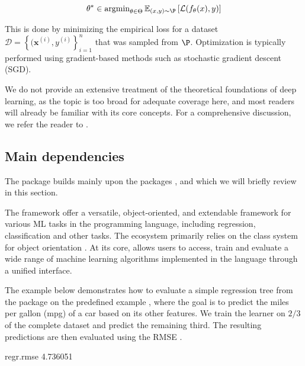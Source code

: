 \documentclass[article]{jss}
\theoremstyle{definition}
\begin{document}
\begin{equation}
\theta^* \in \operatorname{argmin}_{\theta \in \Theta} \mathbb{E}_{(x, y) \sim \P} \left[ \mathcal{L}(f_{\theta}(x), y) \right]
\end{equation}

This is done by minimizing the empirical loss for a dataset $\mathcal{D} = \left\{ (\mathbf{x}^{(i)}, y^{(i)} \right\}_{i=1}^n$ that was sampled from $\P$.
Optimization is typically performed using gradient-based methods such as stochastic gradient descent (SGD).

We do not provide an extensive treatment of the theoretical foundations of deep learning, as the topic is too broad for adequate coverage here, and most readers will already be familiar with its core concepts. For a comprehensive discussion, we refer the reader to \cite{bishop2023deep}.


\subsection{Main dependencies}

The  \rlang{} package builds mainly upon the \rlang{} packages  \citep{ref-mlr32019},  \citep{ref-mlr3pipelines2021} and  \citep{ref-torch2025} which we will briefly review in this section.

The  framework offer a versatile, object-oriented, and extendable framework for various ML tasks in the  programming language, including regression, classification and other tasks.
The ecosystem primarily relies on the  class system for object orientation \citep{ref-r6chang}.
At its core,  allows users to access, train and evaluate a wide range of machine learning algorithms implemented in the  language through a unified interface.

The example below demonstrates how to evaluate a simple regression tree  from the  package \citep{ref-rpart2025} on the predefined  example  \citep{ref-henderson1981building}, where the goal is to predict the miles per gallon (mpg) of a car based on its other features.
We train the learner on $2/3$ of the complete dataset and predict the remaining third.
The resulting predictions are then evaluated using the RMSE .

\begin{CodeOutput}
regr.rmse
 4.736051
\end{CodeOutput}
\end{document}

